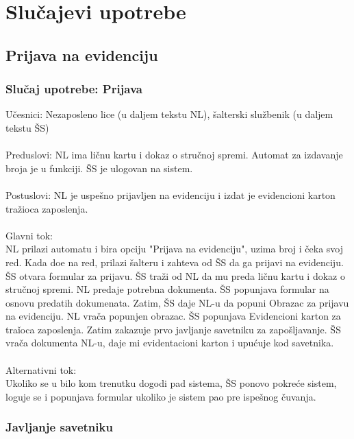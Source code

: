 \section{Slu\v cajevi upotrebe}

\subsection{Prijava na evidenciju}


\subsubsection{Slu\v caj upotrebe: Prijava}

\noindent U\v cesnici: Nezaposleno lice (u daljem tekstu NL), \v salterski slu\v zbenik (u daljem tekstu \v SS)
\\
\\ Preduslovi: NL ima li\v cnu kartu i dokaz o stru\v cnoj spremi. Automat za izdavanje broja je u funkciji. \v SS je ulogovan na sistem. 
\\
\\ Postuslovi: NL je uspe\v sno prijavljen na evidenciju i izdat je evidencioni karton tra\v zioca zaposlenja.
\\
\\ Glavni tok:
\\ NL prilazi automatu i bira opciju "Prijava na evidenciju", uzima broj i \v ceka svoj red. Kada do\dj e na red, prilazi \v salteru i zahteva od \v SS da ga prijavi na evidenciju. \v SS otvara formular za prijavu. \v SS tra\v zi od NL da mu preda li\v cnu kartu i dokaz o stru\v cnoj spremi. NL predaje potrebna dokumenta. \v SS popunjava formular na osnovu predatih dokumenata. Zatim, \v SS daje NL-u da popuni Obrazac za prijavu na evidenciju. NL vra\v ca popunjen obrazac. \v SS popunjava Evidencioni karton za tra\v ioca zaposlenja. Zatim zakazuje prvo javljanje savetniku za zapo\v sljavanje. \v SS vra\v ca dokumenta NL-u, daje mi evidentacioni karton i upu\' cuje kod savetnika.
\\
\\ Alternativni tok: 
\\ Ukoliko se u bilo kom trenutku dogodi pad sistema, \v SS ponovo pokre\'ce sistem, loguje se i popunjava formular ukoliko je sistem pao pre ispe\v snog \v cuvanja.


\subsubsection{Javljanje savetniku}

